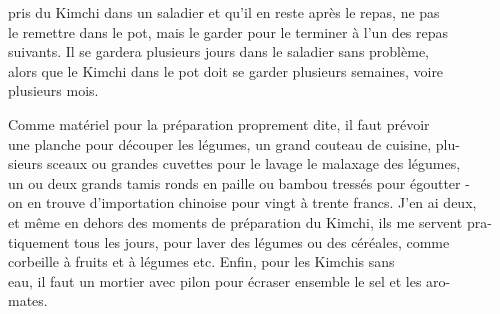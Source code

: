 pris du Kimchi dans un saladier et qu'il en reste après le repas, ne pas\\
le remettre dans le pot, mais le garder pour le terminer à l'un des repas\\
suivants. Il se gardera plusieurs jours dans le saladier sans problème,\\
alors que le Kimchi dans le pot doit se garder plusieurs semaines, voire\\
plusieurs mois.

Comme matériel pour la préparation proprement dite, il faut prévoir\\
une planche pour découper les légumes, un grand couteau de cuisine, plu-\\
sieurs sceaux ou grandes cuvettes pour le lavage  le malaxage des légumes,\\
un ou deux grands tamis ronds en paille ou bambou tressés pour égoutter -\\
on en trouve d'importation chinoise pour vingt à trente francs. J'en ai deux,\\
et même en dehors des moments de préparation du Kimchi, ils me servent pra-\\
tiquement tous les jours, pour laver des légumes ou des céréales, comme\\
 corbeille à fruits et à légumes etc. Enfin, pour les Kimchis sans\\
eau, il faut un mortier avec pilon pour écraser ensemble le sel et les aro-\\
mates.

